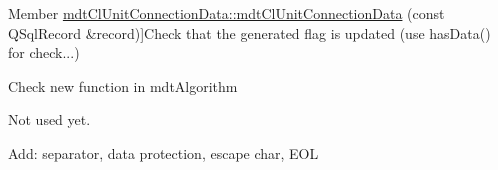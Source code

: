 \begin{DoxyRefList}
\hypertarget{todo__todo000059}{}%
Member \hyperlink{classmdt_cl_unit_connection_data_a6922e05be582dd95de82bfe4dd8434f9}{mdt\-Cl\-Unit\-Connection\-Data\-:\-:mdt\-Cl\-Unit\-Connection\-Data} (const Q\-Sql\-Record \&record)]Check that the generated flag is updated (use has\-Data() for check...)  
\item[\label{todo__todo000094}%
\hypertarget{todo__todo000094}{}%
Member \hyperlink{classmdt_csv_file_afe815d4fbdc08c442c9b1dce447cda75}{mdt\-Csv\-File\-:\-:clear} ()]Check new function in mdt\-Algorithm  
\item[\label{todo__todo000004}%
\hypertarget{todo__todo000004}{}%
Member \hyperlink{classmdt_data_table_manager_a8fa0924a76e8f3fec9617f690cc4e148}{mdt\-Data\-Table\-Manager\-:\-:data\-Set\-Directory} () const ]Not used yet.  
\item[\label{todo__todo000005}%
\hypertarget{todo__todo000005}{}%
Member \hyperlink{classmdt_data_table_manager_abe733f071ca77579522823598e79dd9a}{mdt\-Data\-Table\-Manager\-:\-:export\-To\-Csv\-File} (const Q\-String \&file\-Path, \hyperlink{classmdt_sql_database_manager_a2f5b46d67a88095053a5edfc415c7418}{mdt\-Sql\-Database\-Manager\-::create\-Mode\-\_\-t} mode)]Add\-: separator, data protection, escape char, E\-O\-L 


\end{DoxyRefList}
